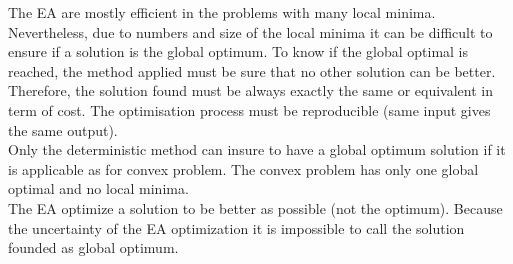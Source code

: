The EA are mostly efficient in the problems with many local minima. Nevertheless, due to numbers and size of the local minima it can be difficult to ensure if a solution is the global optimum. 
To know if the global optimal is reached, the method applied must be sure that no other solution can be better. Therefore, the solution found must be always exactly the same or equivalent in term of cost. The optimisation process must be reproducible (same input gives the same output).\\
 Only the deterministic method can insure to have a global optimum solution  if it is applicable as for convex problem. The convex problem has only one global optimal and no local minima. \\%
  The EA optimize a solution to be better as possible (not the optimum). Because the uncertainty of the EA optimization it is impossible to call  the solution founded as global optimum.
 
